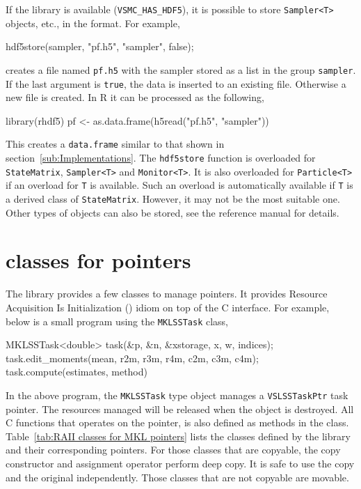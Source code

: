 If the \hdf library is available (\verb|VSMC_HAS_HDF5|), it is possible to
store \verb|Sampler<T>| objects, etc., in the \hdf format. For example,
\begin{cppcode}
  hdf5store(sampler, "pf.h5", "sampler", false);
\end{cppcode}
creates a \hdf file named \verb|pf.h5| with the sampler stored as a list in the
group \verb|sampler|. If the last argument is \verb|true|, the data is inserted
to an existing file. Otherwise a new file is created. In R it can be processed
as the following,
\begin{rcode}
  library(rhdf5)
  pf <- as.data.frame(h5read("pf.h5", "sampler"))
\end{rcode}
This creates a \verb|data.frame| similar to that shown in
section~\ref{sub:Implementations}. The \verb|hdf5store| function is overloaded
for \verb|StateMatrix|, \verb|Sampler<T>| and \verb|Monitor<T>|. It is also
overloaded for \verb|Particle<T>| if an overload for \verb|T| is available.
Such an overload is automatically available if \verb|T| is a derived class of
\verb|StateMatrix|. However, it may not be the most suitable one. Other types
of objects can also be stored, see the reference manual for details.

\section{\protect\raii classes for \protect\mkl pointers}
\label{sec:RAII classes for MKL pointers}

The library provides a few classes to manage \mkl pointers. It provides
Resource Acquisition Is Initialization (\raii) idiom on top of the \mkl C
interface. For example, below is a small program using the \verb|MKLSSTask|
class,
\begin{cppcode}
  MKLSSTask<double> task(&p, &n, &xstorage, x, w, indices);
  task.edit_moments(mean, r2m, r3m, r4m, c2m, c3m, c4m);
  task.compute(estimates, method)
\end{cppcode}
In the above program, the \verb|MKLSSTask| type object manages a
\verb|VSLSSTaskPtr| task pointer. The resources managed will be released when
the object is destroyed. All C functions that operates on the pointer, is also
defined as methods in the class. Table~\ref{tab:RAII classes for MKL pointers}
lists the classes defined by the library and their corresponding \mkl pointers.
For those classes that are copyable, the copy constructor and assignment
operator perform deep copy. It is safe to use the copy and the original
independently. Those classes that are not copyable are movable.

